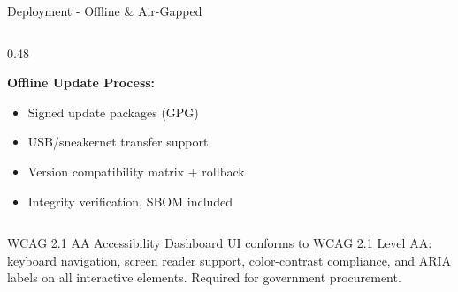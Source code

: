 \begin{frame}{Deployment - Offline \& Air-Gapped}
\begin{columns}[T]
\begin{column}{0.48\textwidth}
      \vspace{0.1cm}

      \textbf{Offline Update Process:}
      \begin{itemize}
        \setlength{\itemsep}{0pt}
        \item Signed update packages (GPG)
        \item USB/sneakernet transfer support
        \item Version compatibility matrix + rollback
        \item Integrity verification, SBOM included
      \end{itemize}
    \end{column}
  \end{columns}

  \vspace{0.2cm}

  \begin{alertblock}{WCAG 2.1 AA Accessibility}
    \scriptsize
    Dashboard UI conforms to WCAG 2.1 Level AA: keyboard navigation, screen reader
    support, color-contrast compliance, and ARIA labels on all interactive elements.
    Required for government procurement.
  \end{alertblock}
\end{frame}
